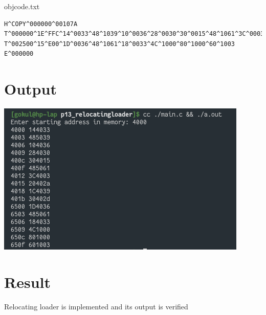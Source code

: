 \documentclass[13pt,oneside]{book}
\begin{document}
	objcode.txt
	\begin{verbatim}
H^COPY^000000^00107A
T^000000^1E^FFC^14^0033^48^1039^10^0036^28^0030^30^0015^48^1061^3C^0003^20^002A^1C^0039^30^002D
T^002500^15^E00^1D^0036^48^1061^18^0033^4C^1000^80^1000^60^1003
E^000000		
	\end{verbatim}
	
    \section*{Output}
    \includegraphics[width=\textwidth]{img/p13.png}
     
\Large
\section*{Result}
\large
Relocating loader is implemented and its output is verified
\end{document}
